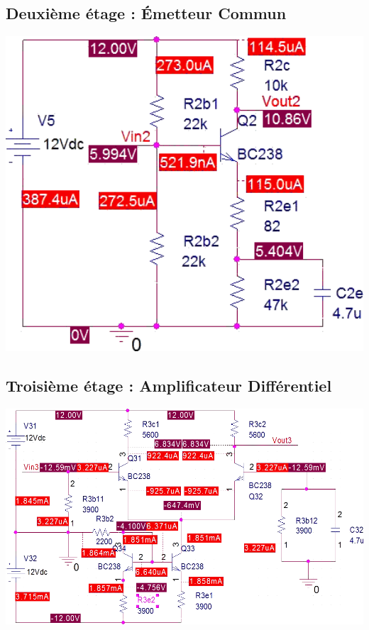    \subsection{Deuxième étage : Émetteur Commun}
    \includegraphics[width=17cm]{images/2}

   \subsection{Troisième étage : Amplificateur Différentiel}
    \includegraphics[width=17cm]{images/3}

